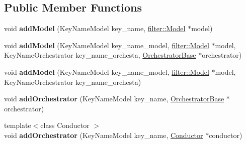 \subsection*{Public Member Functions}
\begin{DoxyCompactItemize}
\item 
\mbox{\label{classorchestrator_1_1_orchestrator_factory_a9745c2c9a8cd40c2bf1db641b2c0389e}} 
void {\bfseries add\+Model} (Key\+Name\+Model key\+\_\+name, \hyperlink{classfilter_1_1_model}{filter\+::\+Model} $\ast$model)
\item 
\mbox{\label{classorchestrator_1_1_orchestrator_factory_a8e1e9d932622f0fb8d1a9487a48008c2}} 
void {\bfseries add\+Model} (Key\+Name\+Model key\+\_\+name\+\_\+model, \hyperlink{classfilter_1_1_model}{filter\+::\+Model} $\ast$model, Key\+Name\+Orchestrator key\+\_\+name\+\_\+orchesta, \hyperlink{classorchestrator_1_1_orchestrator_base}{Orchestrator\+Base} $\ast$orchestrator)
\item 
\mbox{\label{classorchestrator_1_1_orchestrator_factory_ae19daca5fe88af7d8e85eb6fecc1ced4}} 
void {\bfseries add\+Model} (Key\+Name\+Model key\+\_\+name\+\_\+model, \hyperlink{classfilter_1_1_model}{filter\+::\+Model} $\ast$model, Key\+Name\+Orchestrator key\+\_\+name\+\_\+orchesta)
\item 
\mbox{\label{classorchestrator_1_1_orchestrator_factory_a56a242741fe41bb5eef98dce57ce79e0}} 
void {\bfseries add\+Orchestrator} (Key\+Name\+Model key\+\_\+name, \hyperlink{classorchestrator_1_1_orchestrator_base}{Orchestrator\+Base} $\ast$orchestrator)
\item 
\mbox{\label{classorchestrator_1_1_orchestrator_factory_a47b8149961f526c4af00eeeddfffad20}} 
{\footnotesize template$<$class Conductor $>$ }\\void {\bfseries add\+Orchestrator} (Key\+Name\+Model key\+\_\+name, \hyperlink{classorchestrator_1_1_conductor}{Conductor} $\ast$conductor)
\item 
\mbox{\label{classorchestrator_1_1_orchestrator_factory_a9e763fbd37578e3f1798173affe03fc8}} 

\end{DoxyCompactItemize}
